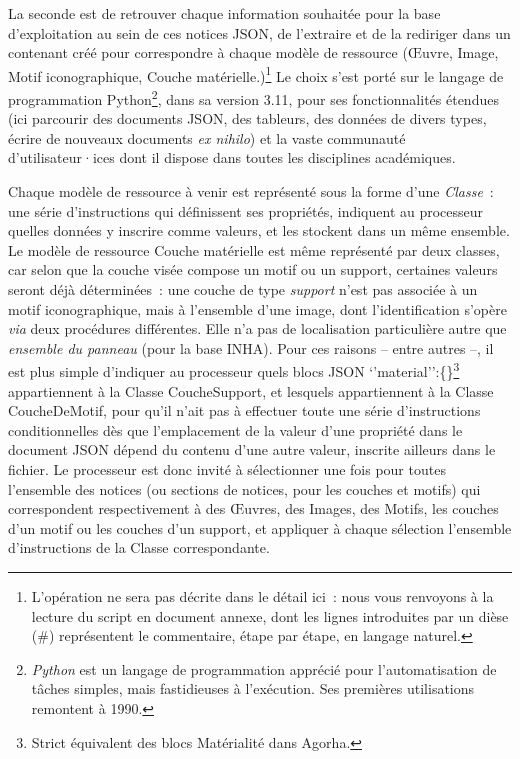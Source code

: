\documentclass[a4paper,12pt, twoside]{book}
\begin{document}
La seconde est de retrouver chaque information souhaitée pour la base d’exploitation au sein de ces notices JSON, de l’extraire et de la rediriger dans un contenant créé pour correspondre à chaque modèle de ressource (\textsf{Œuvre, Image, Motif iconographique, Couche matérielle}.)\footnote{L’opération ne sera pas décrite dans le détail ici~: nous vous renvoyons à la lecture du script en document annexe, dont les lignes introduites par un dièse (\#) représentent le commentaire, étape par étape, en langage naturel.} Le choix s’est porté sur le langage de programmation Python\footnote{\emph{Python} est un langage de programmation apprécié pour l’automatisation de tâches simples, mais fastidieuses à l’exécution. Ses premières utilisations remontent à 1990.}, dans sa version 3.11, pour ses fonctionnalités étendues (ici parcourir des documents JSON, des tableurs, des données de divers types, écrire de nouveaux documents \textit{ex nihilo}) et la vaste communauté d’utilisateur·ices dont il dispose dans toutes les disciplines académiques.

Chaque modèle de ressource à venir est représenté sous la forme d’une \textit{Classe}~: une série d’instructions qui définissent ses propriétés, indiquent au processeur quelles données y inscrire comme valeurs, et les stockent dans un même ensemble. Le modèle de ressource \textsf{Couche matérielle} est même représenté par deux classes, car selon que la couche visée compose un motif ou un support, certaines valeurs seront déjà déterminées~: une couche de type \textit{support} n’est pas associée à un motif iconographique, mais à l’ensemble d’une image, dont l’identification s’opère \textit{via} deux procédures différentes. Elle n’a pas de localisation particulière autre que \textit{ensemble du panneau} (pour la base INHA). Pour ces raisons – entre autres –, il est plus simple d’indiquer au processeur quels blocs JSON \textsf{‘’material’’:\{\}}\footnote{Strict équivalent des blocs \textsf{Matérialité} dans Agorha.} appartiennent à la Classe \textsf{CoucheSupport}, et lesquels appartiennent à la Classe \textsf{CoucheDeMotif}, pour qu’il n’ait pas à effectuer toute une série d’instructions conditionnelles dès que l’emplacement de la valeur d’une propriété dans le document JSON dépend du contenu d’une autre valeur, inscrite ailleurs dans le fichier. Le processeur est donc invité à sélectionner une fois pour toutes l’ensemble des notices (ou sections de notices, pour les couches et motifs) qui correspondent respectivement à des \textsf{Œuvres}, des \textsf{Images}, des \textsf{Motifs}, les couches d’un motif ou les couches d’un support, et appliquer à chaque sélection l’ensemble d’instructions de la Classe correspondante.
\end{document}
